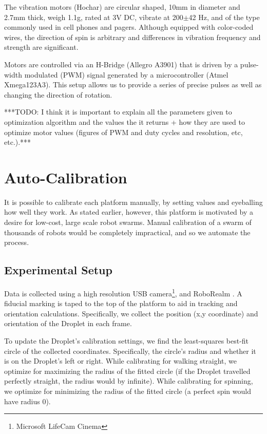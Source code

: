 \documentclass[letterpaper, 10pt, conference]{ieeeconf}
\begin{document}
The vibration motors (Hochar) are circular shaped, 10mm in diameter and 2.7mm thick, weigh 1.1g, rated at 3V DC, vibrate at 200$\pm$42 Hz, and of the type commonly used in cell phones and pagers. Although equipped with color-coded wires, the direction of spin is arbitrary and differences in vibration frequency and strength are significant. 

Motors are controlled via an H-Bridge (Allegro A3901) that is driven by a pulse-width modulated (PWM) signal generated by a microcontroller (Atmel Xmega123A3). This setup allows us to provide a series of precise pulses as well as changing the direction of rotation.    

***TODO: I think it is important to explain all the parameters given to optimization algorithm and the values the it returns + how they are used to optimize motor values (figures of PWM and duty cycles and resolution, etc, etc.).***


\section{Auto-Calibration}

It is possible to calibrate each platform manually, by setting values and eyeballing how well they work. As stated earlier, however, this platform is motivated by a desire for low-cost, large scale robot swarms.  Manual calibration of a swarm of thousands of robots would be completely impractical, and so we automate the process.

\subsection{Experimental Setup}
Data is collected using a high resolution USB camera\footnote{Microsoft LifeCam Cinema}, and RoboRealm \cite{RoboRealm}. A fiducial marking is taped to the top of the platform to aid in tracking and orientation calculations. Specifically, we collect the position (x,y coordinate) and orientation of the Droplet in each frame.

To update the Droplet's calibration settings, we find the least-squares best-fit circle of the collected coordinates. Specifically, the circle's radius and whether it is on the Droplet's left or right. While calibrating for walking straight, we optimize for maximizing the radius of the fitted circle (if the Droplet travelled perfectly straight, the radius would by infinite). While calibrating for spinning, we optimize for minimizing the radius of the fitted circle (a perfect spin would have radius 0).
\end{document}
